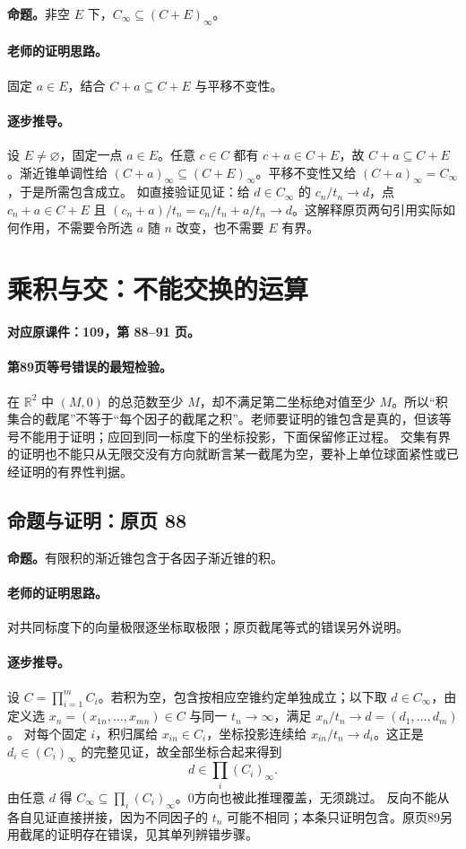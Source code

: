 \documentclass[11pt,a4paper]{article}
\newcommand{\R}{\mathbb{R}}\newcommand{\N}{\mathbb{N}}
\theoremstyle{definition}\newtheorem{definition}{定义}\newtheorem{example}{例}
\begin{document}
\textbf{命题。}非空 $E$ 下，$C_\infty\subseteq(C+E)_\infty$。

\paragraph{老师的证明思路。}固定 $a\in E$，结合 $C+a\subseteq C+E$ 与平移不变性。

\paragraph{逐步推导。}
设 $E\ne\varnothing$，固定一点 $a\in E$。任意 $c\in C$ 都有 $c+a\in C+E$，故 $C+a\subseteq C+E$。渐近锥单调性给 $(C+a)_\infty\subseteq(C+E)_\infty$。平移不变性又给 $(C+a)_\infty=C_\infty$，于是所需包含成立。
如直接验证见证：给 $d\in C_\infty$ 的 $c_n/t_n\to d$，点 $c_n+a\in C+E$ 且 $(c_n+a)/t_n=c_n/t_n+a/t_n\to d$。这解释原页两句引用实际如何作用，不需要令所选 $a$ 随 $n$ 改变，也不需要 $E$ 有界。


\clearpage\section{乘积与交：不能交换的运算}\label{g:109:88}

\textbf{对应原课件：109，第 88--91 页。}


\paragraph{第89页等号错误的最短检验。}
在 $\R^2$ 中 $(M,0)$ 的总范数至少 $M$，却不满足第二坐标绝对值至少 $M$。所以“积集合的截尾”不等于“每个因子的截尾之积”。老师要证明的锥包含是真的，但该等号不能用于证明；应回到同一标度下的坐标投影，下面保留修正过程。
交集有界的证明也不能只从无限交没有方向就断言某一截尾为空，要补上单位球面紧性或已经证明的有界性判据。


\subsection{命题与证明：原页 88}

\textbf{命题。}有限积的渐近锥包含于各因子渐近锥的积。

\paragraph{老师的证明思路。}对共同标度下的向量极限逐坐标取极限；原页截尾等式的错误另外说明。

\paragraph{逐步推导。}
设 $C=\prod_{i=1}^mC_i$。若积为空，包含按相应空锥约定单独成立；以下取 $d\in C_\infty$，由定义选 $x_n=(x_{1n},\ldots,x_{mn})\in C$ 与同一 $t_n\to\infty$，满足 $x_n/t_n\to d=(d_1,\ldots,d_m)$。
对每个固定 $i$，积归属给 $x_{in}\in C_i$，坐标投影连续给 $x_{in}/t_n\to d_i$。这正是 $d_i\in(C_i)_\infty$ 的完整见证，故全部坐标合起来得到
\[d\in\prod_i(C_i)_\infty.\]
由任意 $d$ 得 $C_\infty\subseteq\prod_i(C_i)_\infty$。0方向也被此推理覆盖，无须跳过。
反向不能从各自见证直接拼接，因为不同因子的 $t_n$ 可能不相同；本条只证明包含。原页89另用截尾的证明存在错误，见其单列辨错步骤。
\end{document}
